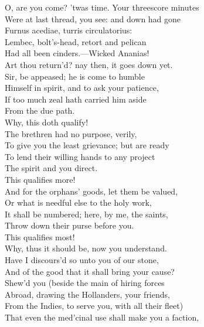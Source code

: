 \documentclass[a4paper,oneside]{memoir}
\begin{document}
\begin{drama*}
\subtlespeaks O, are you come? 'twas time. Your threescore minutes\\
Were at last thread, you see: and down had gone\\
Furnus acediae, turris circulatorius:\\
Lembec, bolt's-head, retort and pelican\\
Had all been cinders.---Wicked Ananias!\\
Art thou return'd? nay then, it goes down yet.\\
\tribulationspeaks Sir, be appeased; he is come to humble\\
Himself in spirit, and to ask your patience,\\
If too much zeal hath carried him aside\\
From the due path.\\
\subtlespeaks {} Why, this doth qualify!\\
\tribulationspeaks The brethren had no purpose, verily,\\
To give you the least grievance; but are ready\\
To lend their willing hands to any project\\
The spirit and you direct.\\
\subtlespeaks {} This qualifies more!\\
\tribulationspeaks And for the orphans' goods, let them be valued,\\
Or what is needful else to the holy work,\\
It shall be numbered; here, by me, the saints,\\
Throw down their purse before you.\\
\subtlespeaks {} This qualifies most!\\
Why, thus it should be, now you understand.\\
Have I discours'd so unto you of our stone,\\
And of the good that it shall bring your cause?\\
Shew'd you (beside the main of hiring forces\\
Abroad, drawing the Hollanders, your friends,\\
From the Indies, to serve you, with all their fleet)\\
That even the med'cinal use shall make you a faction,\\

\end{drama*}
\end{document}
